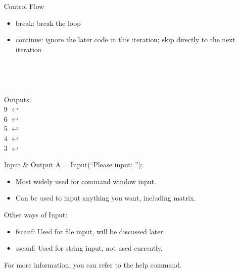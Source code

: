 \begin{frame}{Control Flow}
\begin{itemize}
\item break: break the loop
\item continue: ignore the later code in this iteration; skip directly to the next iteration
\end{itemize}
\begin{minipage}{0.05\textwidth}
~\\
\end{minipage}
\begin{minipage}{0.5\textwidth}

\end{minipage}
\begin{minipage}{0.05\textwidth}
~\\
\end{minipage}
\begin{minipage}{0.35\textwidth}
Outputs: \\
9 $\hookleftarrow$ \\
6 $\hookleftarrow$ \\
5 $\hookleftarrow$ \\
4 $\hookleftarrow$ \\
3 $\hookleftarrow$ \\
\end{minipage}
\end{frame}

\begin{frame}{Input \& Output}
A = Input(``Please input: '');
\begin{itemize}
	\item Most widely used for command window input.
	\item Can be used to input anything you want, including matrix.
\end{itemize}
Other ways of Input: 
\begin{itemize}
	\item fscanf: Used for file input, will be discussed later.
	\item sscanf: Used for string input, not used currently.
\end{itemize}
For more information, you can refer to the help command.
\end{frame}

